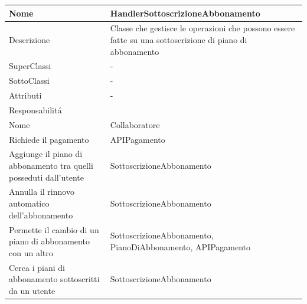 \begin{center}
    \begin{longtable}{ |p{3cm}|p{3cm}|p{3cm}|p{3cm}| }
        \hline
        Nome & \multicolumn{3}{|p{9cm}|}{HandlerSottoscrizioneAbbonamento} \\\hline
        Descrizione & \multicolumn{3}{|p{9cm}|}{Classe che gestisce le operazioni che possono essere fatte su una sottoscrizione di piano di abbonamento} \\\hline
        SuperClassi & \multicolumn{3}{|p{9cm}|}{-} \\\hline
        SottoClassi & \multicolumn{3}{|p{9cm}|}{-} \\\hline
        Attributi & \multicolumn{3}{|p{9cm}|}{-} \\\hline
        \multicolumn{4}{|p{12cm}|}{Responsabilit\'a} \\\hline
        \multicolumn{2}{|p{6cm}|}{Nome} & \multicolumn{2}{|p{6cm}|}{Collaboratore} \\\hline
        \multicolumn{2}{|p{6cm}|}{Richiede il pagamento} & \multicolumn{2}{|p{6cm}|}{APIPagamento} \\\hline
        \multicolumn{2}{|p{6cm}|}{Aggiunge il piano di abbonamento tra quelli posseduti dall'utente} & \multicolumn{2}{|p{6cm}|}{SottoscrizioneAbbonamento} \\\hline
        \multicolumn{2}{|p{6cm}|}{Annulla il rinnovo automatico dell'abbonamento} & \multicolumn{2}{|p{6cm}|}{SottoscrizioneAbbonamento} \\\hline
        \multicolumn{2}{|p{6cm}|}{Permette il cambio di un piano di abbonamento con un altro} & \multicolumn{2}{|p{6cm}|}{SottoscrizioneAbbonamento, PianoDiAbbonamento, APIPagamento} \\\hline
        \multicolumn{2}{|p{6cm}|}{Cerca i piani di abbonamento sottoscritti da un utente} & \multicolumn{2}{|p{6cm}|}{SottoscrizioneAbbonamento} \\\hline
    \end{longtable}
\end{center}

